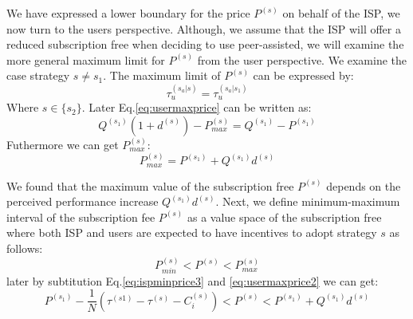 \documentclass[paper]{ieice}
\begin{document}
We have expressed a lower boundary for the price $P^{(s)}$ on behalf of the ISP, we now turn to the users perspective.  
Although, we assume that the ISP will offer a reduced subscription free when deciding to use peer-assisted, we will examine the more general maximum limit for $P^{(s)}$ from the user perspective.
We examine the case strategy $s \neq s_1$.
The maximum limit of $P^{(s)}$ can be expressed by:
\begin{equation}\label{eq:usermaxprice}
	\tau^{(s_a|s)}_u = \tau^{(s_a|s_1)}_u
\end{equation}
Where $s \in \{s_2\}$. Later Eq.\ref{eq:usermaxprice} can be written as:
\begin{equation}
	Q^{(s_1)} ( 1 + d^{(s)} ) - P^{(s)}_{max} = Q^{(s_1)} - P^{(s_1)}
\end{equation}
Futhermore we can get $P^{(s)}_{max}$:  
\begin{equation}\label{eq:usermaxprice2}
	P^{(s)}_{max} = P^{(s_1)} + Q^{(s_1)} d^{(s)}
\end{equation}

We found that the maximum value of the subscription free $P^{(s)}$ depends on the perceived performance increase $Q^{(s_1)} d^{(s)}$.
Next, we define minimum-maximum interval of the subscription fee $P^{(s)}$ as a value space of the subscription free where both ISP and users are expected to have incentives to adopt strategy $s$ as follows:
\begin{equation}
	P^{(s)}_{min} < P^{(s)} < P^{(s)}_{max}
\end{equation}
later by subtitution Eq.\ref{eq:ispminprice3} and \ref{eq:usermaxprice2} we can get:
\begin{equation}\label{eq:min-max-interval}
	P^{(s_1)} - \frac{1}{N} ( \tau^{(s1)} - \tau^{(s)} -  C^{(s)}_i  ) < P^{(s)} <  P^{(s_1)} + Q^{(s_1)} d^{(s)} 
\end{equation}
\end{document}

